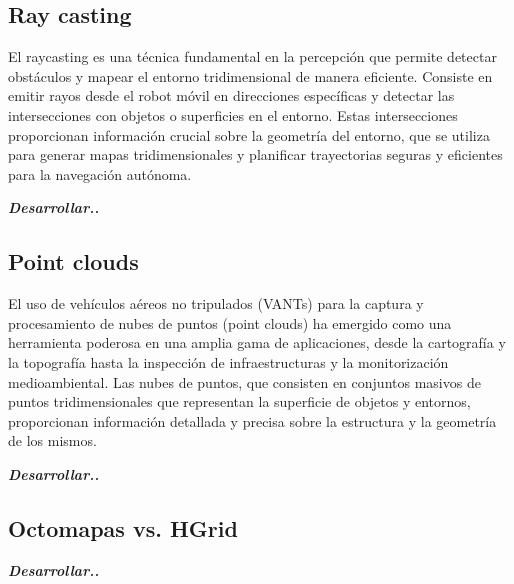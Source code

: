 \subsection{Ray casting}

El raycasting es una técnica fundamental en la percepción que permite detectar obstáculos y mapear el entorno tridimensional de manera eficiente. Consiste en emitir rayos desde el robot móvil en direcciones específicas y detectar las intersecciones con objetos o superficies en el entorno. Estas intersecciones proporcionan información crucial sobre la geometría del entorno, que se utiliza para generar mapas tridimensionales y planificar trayectorias seguras y eficientes para la navegación autónoma.

\textit{\textbf{Desarrollar..}}

\subsection{Point clouds}

El uso de vehículos aéreos no tripulados (VANTs) para la captura y procesamiento de nubes de puntos (point clouds) ha emergido como una herramienta poderosa en una amplia gama de aplicaciones, desde la cartografía y la topografía hasta la inspección de infraestructuras y la monitorización medioambiental. Las nubes de puntos, que consisten en conjuntos masivos de puntos tridimensionales que representan la superficie de objetos y entornos, proporcionan información detallada y precisa sobre la estructura y la geometría de los mismos.

\textit{\textbf{Desarrollar..}}

\subsection{Octomapas vs. HGrid}

\textit{\textbf{Desarrollar..}}


